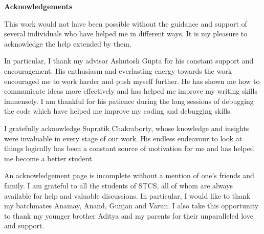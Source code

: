 
\centerline{\bfseries Acknowledgements}
\vspace{0.3 cm}

\noindent This work would not have been possible without the guidance and support of several individuals who have helped me in different ways. It is my pleasure to acknowledge the help extended by them.
\vspace{0.3 cm}

In particular, I thank my advisor Ashutosh Gupta for his constant support and encouragement. His enthusiasm and everlasting energy towards the work encouraged me to work harder and push myself further. He has shown me how to communicate ideas more
effectively and has helped me improve my writing skills immensely. I am thankful for his patience during the long sessions of debugging the code which have helped me improve my coding and debugging skills. 
\vspace{0.3 cm}

I gratefully acknowledge Supratik Chakraborty, whose knowledge and insights were invaluable in every stage of our work. His endless endeavour to look at things logically has been a constant source of motivation for me and has helped me become a better student.

\vspace{0.3 cm}

An acknowledgement page is incomplete without a mention of one's friends and family. I am grateful to all the students of STCS, all of whom are always available for help and valuable discussions. In particular, I would like to thank my batchmates Anamay, Anand, Gunjan and Varun. I also take this opportunity to thank my younger brother Aditya and my parents for their unparalleled love and support.

